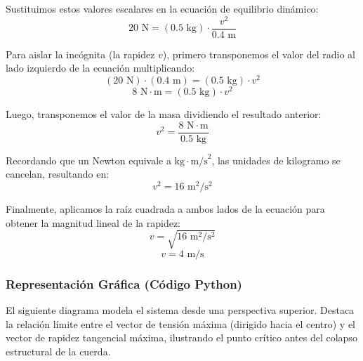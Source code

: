 \documentclass{article}
\begin{document}
Sustituimos estos valores escalares en la ecuación de equilibrio dinámico:
$$20 \text{ N} = (0.5 \text{ kg}) \cdot \frac{v^2}{0.4 \text{ m}}$$

Para aislar la incógnita (la rapidez $v$), primero transponemos el valor del radio al lado izquierdo de la ecuación multiplicando:
$$(20 \text{ N}) \cdot (0.4 \text{ m}) = (0.5 \text{ kg}) \cdot v^2$$
$$8 \text{ N}\cdot\text{m} = (0.5 \text{ kg}) \cdot v^2$$

Luego, transponemos el valor de la masa dividiendo el resultado anterior:
$$v^2 = \frac{8 \text{ N}\cdot\text{m}}{0.5 \text{ kg}}$$

Recordando que un Newton equivale a $\text{kg}\cdot\text{m/s}^2$, las unidades de kilogramo se cancelan, resultando en:
$$v^2 = 16 \text{ m}^2/\text{s}^2$$

Finalmente, aplicamos la raíz cuadrada a ambos lados de la ecuación para obtener la magnitud lineal de la rapidez:
$$v = \sqrt{16 \text{ m}^2/\text{s}^2}$$
$$v = 4 \text{ m/s}$$

\subsubsection*{Representación Gráfica (Código Python)}
El siguiente diagrama modela el sistema desde una perspectiva superior. Destaca la relación límite entre el vector de tensión máxima (dirigido hacia el centro) y el vector de rapidez tangencial máxima, ilustrando el punto crítico antes del colapso estructural de la cuerda.
\end{document}
